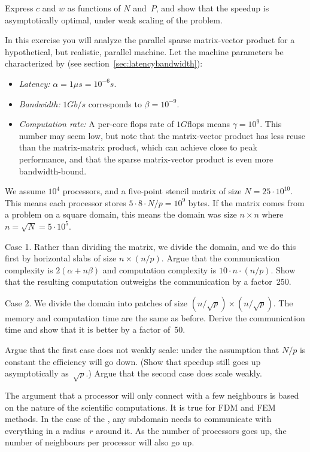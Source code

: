 \begin{exercise}
  Express $c$ and $w$ as functions of $N$ and~$P$, and show that the
  speedup is asymptotically optimal, under weak scaling of the problem.
\end{exercise}

\begin{exercise}
  In this exercise you will analyze the parallel sparse matrix-vector
  product for a hypothetical, but realistic, parallel machine.
  Let the machine parameters be characterized by (see
  section~\ref{sec:latencybandwidth}):
  \begin{itemize}
  \item {\it Latency:} $\alpha=1\mu s=10^{-6}s$.
  \item {\it Bandwidth:} $1Gb/s$ corresponds to $\beta=10^{-9}$.
  \item {\it Computation rate:} A per-core flops rate of $1G$flops
    means $\gamma=10^9$. This number may seem low, but note that the
    matrix-vector product has less reuse than the matrix-matrix
    product, which can achieve close to peak performance,
    and that the sparse matrix-vector product is even more
    bandwidth-bound.
  \end{itemize}
  We assume $10^4$ processors, and a five-point
  stencil matrix of size $N=25\cdot 10^{10}$. This means each
  processor stores $5\cdot 8\cdot N/p=10^9$ bytes. If the matrix comes
  from a problem on a square domain, this means the domain was size
  $n\times n$ where $n=\sqrt N=5\cdot 10^5$.

  Case 1. Rather than dividing the matrix, we divide the domain, and
  we do this first by horizontal slabs of size $n\times (n/p)$. Argue
  that the communication complexity is $2(\alpha+n\beta)$ and
  computation complexity is $10\cdot n\cdot (n/p)$. Show that the
  resulting computation outweighs the communication by a factor~250.

  Case 2. We divide the domain into patches of size
  $(n/\sqrt p)\times (n/\sqrt p)$.
  The memory and computation time are the same as
  before. Derive the communication time and show that it is better by
  a factor of~50. 

  Argue that the first case does not weakly scale: under the
  assumption that $N/p$ is constant the efficiency will go down. 
  (Show that speedup still goes up asymptotically as~$\sqrt p$.)
  Argue that the second case does scale weakly.
\end{exercise}

The argument that a processor will only connect with a few neighbours
is based on the nature of the scientific computations. It is true for
\ac{FDM} and \ac{FEM} methods.
In the case
of the , any subdomain needs to communicate with
everything in a radius~$r$ around it. As the number of processors goes
up, the number of neighbours per processor will also go up.

